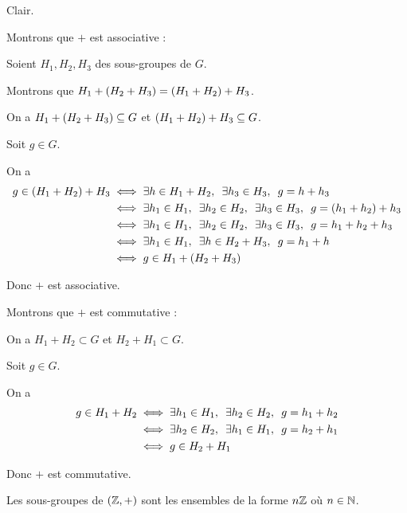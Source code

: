 \begin{dem}[2]
Clair.
\end{dem}

\begin{dem}[3]
Montrons que \(+\) est associative :

Soient \(H_1,H_2,H_3\) des sous-groupes de \(G\).

Montrons que \(H_1+\left(H_2+H_3\right)=\left(H_1+H_2\right)+H_3\).

On a \(H_1+\left(H_2+H_3\right)\subseteq G\) et \(\left(H_1+H_2\right)+H_3\subseteq G\).

Soit \(g\in G\).

On a \[\begin{aligned}
g\in\paren{H_1+H_2}+H_3&\ssi\quantifs{\exists h\in H_1+H_2;\exists h_3\in H_3}g=h+h_3 \\
&\ssi\quantifs{\exists h_1\in H_1;\exists h_2\in H_2;\exists h_3\in H_3}g=\paren{h_1+h_2}+h_3 \\
&\ssi\quantifs{\exists h_1\in H_1;\exists h_2\in H_2;\exists h_3\in H_3}g=h_1+h_2+h_3 \\
&\ssi\quantifs{\exists h_1\in H_1;\exists h\in H_2+H_3}g=h_1+h \\
&\ssi g\in H_1+\paren{H_2+H_3}
\end{aligned}\]

Donc \(+\) est associative.

Montrons que \(+\) est commutative :

On a \(H_1+H_2\subset G\) et \(H_2+H_1\subset G\).

Soit \(g\in G\).

On a \[\begin{aligned}
g\in H_1+H_2&\ssi\quantifs{\exists h_1\in H_1;\exists h_2\in H_2}g=h_1+h_2 \\
&\ssi\quantifs{\exists h_2\in H_2;\exists h_1\in H_1}g=h_2+h_1 \\
&\ssi g\in H_2+H_1
\end{aligned}\]

Donc \(+\) est commutative.
\end{dem}

\begin{theo}
Les sous-groupes de \(\left(\mathbb{Z},+\right)\) sont les ensembles de la forme \(n\mathbb{Z}\) où \(n\in\mathbb{N}\).
\end{theo}

